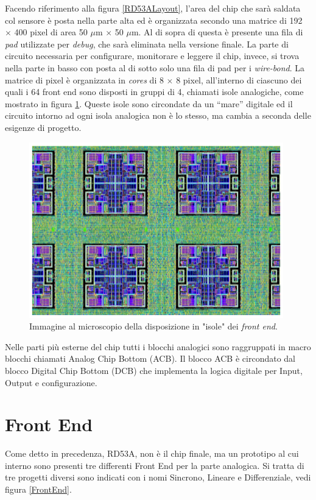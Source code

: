 Facendo riferimento alla figura \ref{RD53ALayout}, l'area del chip che sarà saldata col sensore è posta nella parte alta ed è organizzata secondo una matrice di 192 $\times$ 400 pixel di area 50 $\mu$m $\times$ 50 $\mu$m.
Al di sopra di questa è presente una fila di \textit{pad} utilizzate per \textit{debug}, che sarà eliminata nella versione finale.
La parte di circuito necessaria per configurare, monitorare e leggere il chip, invece, si trova nella parte in basso con posta al di sotto solo una fila di pad per i \textit{wire-bond}. 
La matrice di pixel è organizzata in \textit{cores} di 8 $\times$ 8 pixel, all'interno di ciascuno dei quali i 64 front end sono disposti in gruppi di 4, chiamati isole analogiche, come mostrato in figura \ref{AnalogIsland}. 
Queste isole sono circondate da un ``mare'' digitale ed il circuito intorno ad ogni isola analogica non è lo stesso, ma cambia a seconda delle esigenze di progetto. 

\begin{figure}
\centering
\includegraphics[scale=.5]{Immagini/AnalogIsland}
\caption{Immagine al microscopio della disposizione in "isole" dei \textit{front end}.}
\label{AnalogIsland}
\end{figure} 
Nelle parti più esterne del chip tutti i blocchi analogici sono raggruppati in macro blocchi chiamati Analog Chip Bottom (ACB).
Il blocco ACB è circondato dal blocco Digital Chip Bottom (DCB) che implementa la logica digitale per Input, Output e configurazione. 

\section{Front End}

Come detto in precedenza, RD53A, non è il chip finale, ma un prototipo al cui interno sono presenti tre differenti Front End per la parte analogica.
Si tratta di tre progetti diversi sono indicati con i nomi Sincrono, Lineare e Differenziale, vedi figura \ref{FrontEnd}. 

